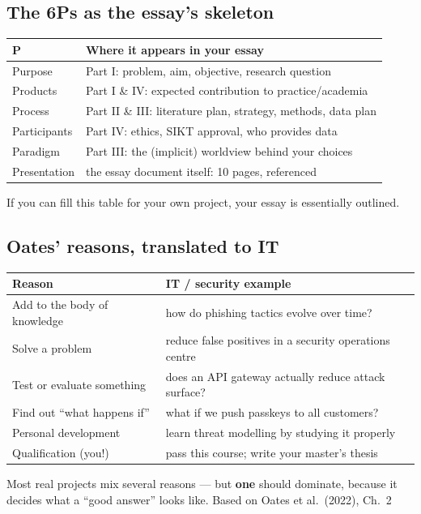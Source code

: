 \documentclass[11pt,a4paper,british,twoside=false,headings=small,chapterprefix=false,numbers=noenddot]{scrbook}
\begin{document}
\subsection{The 6Ps as the essay's skeleton}
\begin{center}\small
\small
  \renewcommand{\arraystretch}{1.35}
  \begin{tabular}{@{}p{2.6cm}p{10.6cm}@{}}
    \toprule
    \textbf{P} & \textbf{Where it appears in your essay}\\
    \midrule
    Purpose       & Part I: problem, aim, objective, research question\\
    Products      & Part I \& IV: expected contribution to practice/academia\\
    Process       & Part II \& III: literature plan, strategy, methods, data plan\\
    Participants  & Part IV: ethics, SIKT approval, who provides data\\
    Paradigm      & Part III: the (implicit) worldview behind your choices\\
    Presentation  & the essay document itself: 10 pages, referenced\\
    \bottomrule
  \end{tabular}
  

  If you can fill this table for your own project, your essay is
  essentially outlined.
\end{center}


\subsection{Oates' reasons, translated to IT}
\begin{center}\small
\small
  \renewcommand{\arraystretch}{1.3}
  \begin{tabular}{@{}p{4.3cm}p{9.0cm}@{}}
    \toprule
    \textbf{Reason} & \textbf{IT / security example}\\
    \midrule
    Add to the body of knowledge & how do phishing tactics evolve over time?\\
    Solve a problem              & reduce false positives in a security operations centre\\
    Test or evaluate something   & does an API gateway actually reduce attack surface?\\
    Find out ``what happens if'' & what if we push passkeys to all customers?\\
    Personal development         & learn threat modelling by studying it properly\\
    Qualification (you!)         & pass this course; write your master's thesis\\
    \bottomrule
  \end{tabular}
  

  Most real projects mix several reasons --- but \textbf{one} should dominate,
  because it decides what a ``good answer'' looks like.
  \hfill {\color{kgrey}\small Based on Oates et al.\ (2022), Ch.\ 2}
\end{center}
\end{document}
